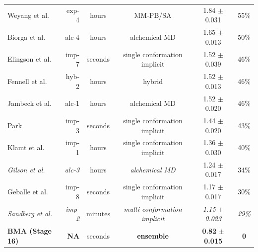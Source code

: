 \documentclass[journal=jpcbfk, manuscript=article]{achemso}
\newcommand{\+}[1]{\ensuremath{\mathbf{#1}}}
\begin{document}
\begin{table}[t]
{\begin{tabular}{l|r|c|c|c|c}
		Weyang et al. & exp-4 &hours & MM-PB/SA & 1.84 $\pm$ 0.031 & 55\%\\		
		Biorga et al.~\cite{Beckstein:2012,Beckstein:2014} & alc-4& hours & alchemical MD & 1.65 $\pm$ 0.013 & 50\%\\ 
		Elingson et al.~\cite{Ellingson:2014} & imp-7 &seconds & single conformation implicit & 1.52 $\pm$ 0.039 & 46\%\\
		Fennell et al.~\cite{Li:2014} & hyb-2 & hours & hybrid & 1.52 $\pm$ 0.013 & 46\%\\																
		Jambeck et al.~\cite{Jambeck:2013} & alc-1&hours  & alchemical MD & 1.52 $\pm$ 0.020 & 46\%\\ 
		Park~\cite{Park:2014} & imp-3 &seconds  & single conformation implicit & 1.44 $\pm$ 0.020 & 43\%\\
		Klamt et al.~\cite{Klamt:2010} & imp-1 &hours & single conformation implicit & 1.36 $\pm$ 0.030 & 40\%\\	
		\textit{Gilson et al.~\cite{Muddana:2014}} & \textit{alc-3} & hours & \textit{alchemical MD} & {1.24 $\pm$ 0.017} & {34\%} \\ 
		Geballe et al.~\cite{Ellingson:2014} & imp-8 & seconds & single conformation implicit & 1.17 $\pm$ 0.017 & 30\%\\
		\textit{Sandberg et al.~\cite{Sandberg:2013}} & \textit{imp-2} &minutes  & \textit{multi-conformation implicit} & \textit{1.15 $\pm$ 0.023} & \textit{29\%}\\
		\textbf{BMA (Stage 16)} & \textbf{NA} & seconds & \textbf{ensemble} & \textbf{0.82} $\pm$ \textbf{0.015} & \textbf{0} \\
		\hline
	\end{tabular}}
	\label{Analysis:Table1:Methods}
\end{table}
\end{document}
